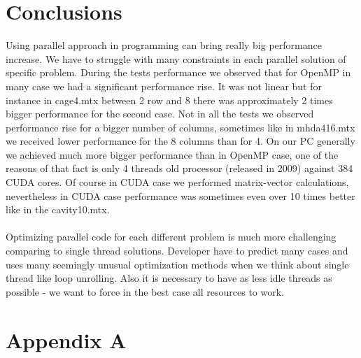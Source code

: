 \documentclass{scrreprt}
\begin{document}
\chapter{Conclusions}

Using parallel approach in programming can bring really big performance increase. We have to struggle with many constraints in each parallel solution of specific problem.
During the tests performance we observed that for OpenMP in many case we had a significant performance rise. It was not linear but for instance in cage4.mtx between 2 row and 8 there was approximately 2 times bigger performance for the second case. Not in all the tests we observed performance rise for a bigger number of columns, sometimes like in mhda416.mtx we received lower performance for the 8 columns than for 4.
On our PC generally we achieved much more bigger performance than in OpenMP case, one of the reasons of that fact is only 4 threads old processor (released in 2009) against 384 CUDA cores. Of course in CUDA case we performed matrix-vector calculations, nevertheless in CUDA case performance was sometimes even over 10 times better like in the cavity10.mtx.
\\
\\
 Optimizing parallel code for each different problem is much more challenging comparing to single thread solutions. Developer have to predict many cases and uses many seemingly unusual optimization methods when we think about single thread like loop unrolling. Also it is necessary to have as less idle threads as possible - we want to force in the best case all resources to work.

\chapter{Appendix A}
\end{document}
